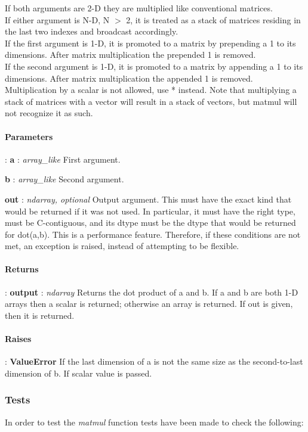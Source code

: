 \documentclass[a4paper,11pt]{article}
\begin{document}
If both arguments are 2-D they are multiplied like conventional matrices.\\ If either argument is N-D, N $ > $ 2, it is treated as a stack of matrices residing in the last two indexes and broadcast accordingly.\\ If the first argument is 1-D, it is promoted to a matrix by prepending a 1 to its dimensions. After matrix multiplication the prepended 1 is removed.\\ If the second argument is 1-D, it is promoted to a matrix by appending a 1 to its dimensions. After matrix multiplication the appended 1 is removed.\\ Multiplication by a scalar is not allowed, use * instead. Note that multiplying a stack of matrices with a vector will result in a stack of vectors, but matmul will not recognize it as such.\\


\paragraph{Parameters}:	
\textbf{a} : \textit{array\_like} First argument.

\textbf{b} : \textit{array\_like} Second argument.

\textbf{out} : \textit{ndarray, optional} Output argument. This must have the exact kind that would be returned if it was not used. In particular, it must have the right type, must be C-contiguous, and its dtype must be the dtype that would be returned for dot(a,b). This is a performance feature. Therefore, if these conditions are not met, an exception is raised, instead of attempting to be flexible.

\paragraph{Returns}:	
\textbf{output} : \textit{ndarray} Returns the dot product of a and b. If a and b are both 1-D arrays then a scalar is returned; otherwise an array is returned. If out is given, then it is returned.

\paragraph{Raises}:	\textbf{ValueError} If the last dimension of a is not the same size as the second-to-last dimension of b. If scalar value is passed.

\subsubsection{Tests}
In order to test the \textit{matmul} function tests have been made to check the following:
\end{document}

